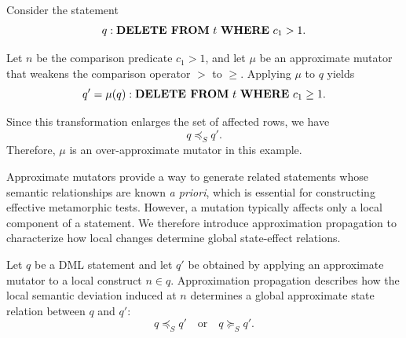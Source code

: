 %	
%	

\begin{example}
	Consider the statement
	\[
	q : \text{\textbf{DELETE FROM} } t
	\text{ \textbf{WHERE} } c_1 > 1.
	\]
	
	Let \(n\) be the comparison predicate \(c_1 > 1\), and let \(\mu\) be an approximate mutator that weakens the comparison operator \(>\) to \(\ge\). 
	Applying \(\mu\) to \(q\) yields
	\[
	q' = \mu(q) : \text{\textbf{DELETE FROM} } t
	\text{ \textbf{WHERE} } c_1 \ge 1.
	\]
	
	Since this transformation enlarges the set of affected rows, we have
	\[
	q \preceq_S q'.
	\]
	Therefore, \(\mu\) is an over-approximate mutator in this example.
\end{example}

Approximate mutators provide a way to generate related statements whose semantic relationships are known \emph{a priori}, which is essential for constructing effective metamorphic tests.
However, a mutation typically affects only a local component of a statement. We therefore introduce approximation propagation to characterize how local changes determine global state-effect relations.

\begin{definition}
	\label{def:approx_propagation}
	
	Let $q$ be a DML statement and let $q'$ be obtained by applying an approximate mutator to a local construct $n \in q$.  
	Approximation propagation describes how the local semantic deviation induced at $n$ determines a global approximate state relation between $q$ and $q'$:
	\[
	q \preceq_S q' \quad \text{or} \quad q \succeq_S q'.
	\]
\end{definition}

